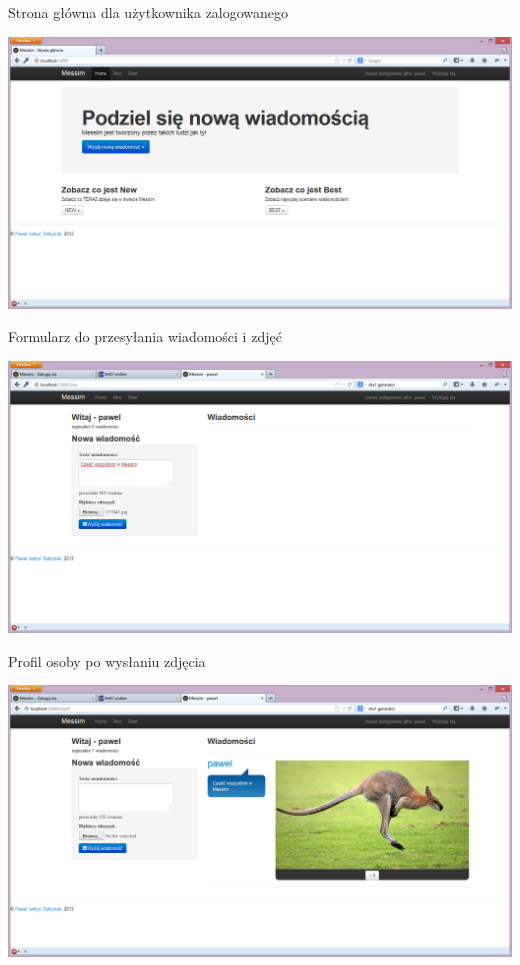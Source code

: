 \documentclass{article}
\begin{document}
Strona główna dla użytkownika zalogowanego

\includegraphics[width=\textwidth]{screenshots/home_page_with_user}

Formularz do przesyłania wiadomości i zdjęć

\includegraphics[width=\textwidth]{screenshots/posting_first_image}

Profil osoby po wysłaniu zdjęcia

\includegraphics[width=\textwidth]{screenshots/posted_first_image}
\end{document}
